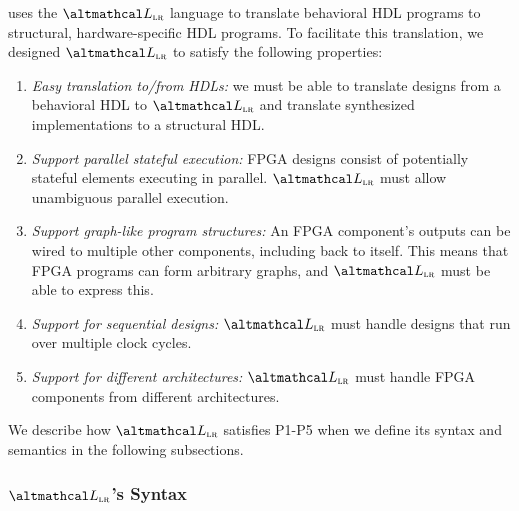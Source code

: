 \lr uses the 
  $\UberLang$ language to
  translate behavioral
  HDL programs
  to structural, 
  hardware-specific
  HDL programs.
To facilitate this
  translation, we
  designed $\UberLang$
  to satisfy the
  following properties:
\begin{enumerate}[label=\textbf{P\arabic*}.]
    \item \textit{Easy translation to/from HDLs:}
        we must be able
        to translate
        designs from 
        a behavioral HDL
        to $\UberLang$
        and translate
        synthesized implementations
        to a structural HDL.
        
    \item \textit{Support parallel stateful execution:}
        FPGA designs
        consist of
        potentially stateful elements
        executing in parallel.
        $\UberLang$ must
        allow unambiguous
        parallel execution.

    \item \textit{Support graph-like program structures:}
        An FPGA component's outputs
        can be wired to
        multiple other components,
        including back
        to itself.
        This means that 
        FPGA programs can
        form arbitrary
        graphs, and $\UberLang$ must
        be able to express this.
        
    \item \textit{Support for sequential designs:}
        $\UberLang$ must handle designs
        that run over multiple clock cycles.
        
    \item \textit{Support for different architectures:}
        $\UberLang$ must handle FPGA components
        from different architectures.
\end{enumerate}
%
We describe how $\UberLang$ satisfies
  P1-P5 when we 
  define its syntax and semantics
  in the following subsections. 


\subsubsection{$\UberLang$'s Syntax}
\label{subsubsec:syntax}

